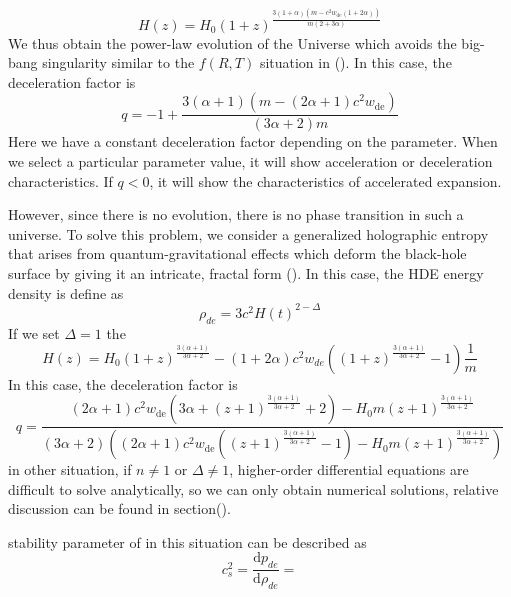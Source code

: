 \documentclass[preprint]{aastex631}
\begin{document}
\begin{equation}
    H(z)= H_0 (1+z)^{\frac{3 (1+\alpha) \left(m-c^2 w_\text{de}(1+2\alpha)\right)}{m(2+3\alpha)}}
\end{equation}
We thus obtain the power-law evolution of the Universe which avoids the big-bang singularity similar to the $f(R,T)$ situation in (\cite{singhStatefinderDiagnosisHolographic2016}). In this case, the deceleration factor is
\begin{equation}
    q = -1+\frac{3 (\alpha +1) \left(m-(2 \alpha +1) c^2 w_\text{de}\right)}{(3 \alpha +2) m}
\end{equation}
Here we have a constant deceleration factor depending on the parameter. When we select a particular parameter value, it will show acceleration or deceleration characteristics. If $q<0$, it will show the characteristics of accelerated expansion.

However, since there is no evolution, there is no phase transition in such a universe. To solve this problem, we consider a generalized holographic entropy that arises from quantum-gravitational effects which deform the black-hole surface by giving it an intricate, fractal form (\cite{PhysRevD.102.123525}). In this case, the HDE energy density is define as
\begin{equation}
    \rho_{de}=3c^2 H(t)^{2-\Delta}
\end{equation}
If we set $\Delta=1$ the 
\begin{equation}
    H(z)= H_0 (1+z)^{\frac{3 (\alpha +1)}{3\alpha +2}}-(1+2 \alpha) c^2 w_{de} \left((1+z)^{\frac{3 (\alpha +1)}{3\alpha +2}}-1\right)\frac{1}{m}
\end{equation}
In this case, the deceleration factor is
\begin{equation}
    q=\frac{(2 \alpha +1) c^2 w_\text{de} \left(3 \alpha +(z+1)^{\frac{3 (\alpha +1)}{3 \alpha +2}}+2\right)-H_0 m (z+1)^{\frac{3 (\alpha +1)}{3 \alpha +2}}}{(3 \alpha +2) \left((2 \alpha +1) c^2 w_\text{de} \left((z+1)^{\frac{3 (\alpha +1)}{3 \alpha +2}}-1\right)-H_0 m (z+1)^{\frac{3 (\alpha +1)}{3 \alpha +2}}\right)}
\end{equation}
in other situation, if $n \neq 1$ or $\Delta \neq 1$, higher-order differential equations are difficult to solve analytically, so we can only obtain numerical solutions, relative discussion can be found in section().


stability parameter of in this situation can be described as
\begin{equation}
    c_s^2=\frac{\text{d} p_{de}}{\text{d} \rho_{de}}=
\end{equation}
\end{document}

